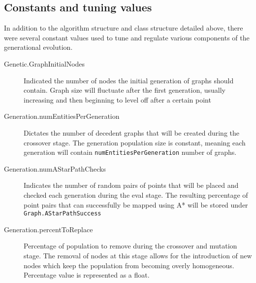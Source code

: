 	\subsection{Constants and tuning values}
	In addition to the algorithm structure and class structure detailed above, there were several constant values used to tune and regulate various components of the generational evolution.
	\begin{description}
		\item[Genetic.GraphInitialNodes] Indicated the number of nodes the initial generation of graphs should contain. Graph size will fluctuate after the first generation, usually increasing and then beginning to level off after a certain point
		\item[Generation.numEntitiesPerGeneration] Dictates the number of decedent graphs that will be created during the crossover stage. The generation population size is constant, meaning each generation will contain \texttt{numEntitiesPerGeneration} number of graphs.
		\item[Generation.numAStarPathChecks] Indicates the number of random pairs of points that will be placed and checked each generation during the eval stage. The resulting percentage of point pairs that can successfully be mapped using A* will be stored under \texttt{Graph.AStarPathSuccess}
		\item[Generation.percentToReplace] Percentage of population to remove during the crossover and mutation stage. The removal of nodes at this stage allows for the introduction of new nodes which keep the population from becoming overly homogeneous. Percentage value is represented as a float.
	\end{description}
	